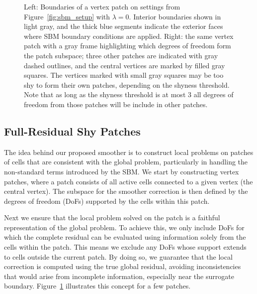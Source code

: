 \documentclass{elsarticle}
\begin{document}
\begin{figure}[!ht]
    \centering
    \begin{subfigure}[b]{0.4\linewidth}
        
    \end{subfigure}
    \qquad
    \begin{subfigure}[b]{0.4\linewidth}
        
    \end{subfigure}
    \caption{
        Left: Boundaries of a vertex patch on settings from Figure~\ref{fig:sbm_setup} with $\lambda=0$. Interior boundaries shown in light gray, and the thick blue
        segments
        indicate the exterior faces where SBM boundary conditions are applied. Right: the same vertex patch with a gray
        frame
        highlighting which degrees of freedom form the patch subspace; three other patches are indicated with gray
        dashed
        outlines, and the central vertices are marked by filled gray squares. The vertices marked with small gray
        squares may  be too shy to form their own patches, depending on the shyness threshold. Note that as long as
        the shyness threshold is at most 3 all degrees of freedom from those patches will be include in other patches.
    }
    \label{fig:single_patch_boundaries}
\end{figure}

\subsection{Full-Residual Shy Patches}
\label{sec:shy_patches}
The idea behind our proposed smoother is to construct local problems on patches of cells that are consistent with
the global problem, particularly in handling the non-standard terms introduced by the SBM. We start by constructing
vertex patches, where a patch consists of all active cells connected to a given vertex (the central vertex). The
subspace for the smoother correction is then defined by the degrees of freedom (DoFs) supported by the cells within
this patch.

Next we ensure that the local problem solved on the patch is a faithful representation of the global problem. To
achieve this, we only include DoFs for which the complete residual can be evaluated using information solely from the
cells within the patch. This means we exclude any DoFs whose support extends to cells outside the current patch. By
doing so, we guarantee that the local correction is computed using the true global residual, avoiding inconsistencies
that would arise from incomplete information, especially near the surrogate boundary.
Figure~\ref{fig:single_patch_boundaries} illustrates this concept for a few patches.
\end{document}

